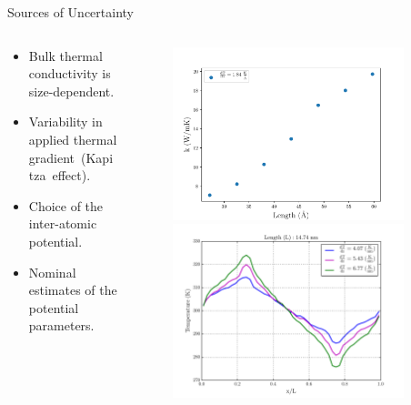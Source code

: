 \documentclass[xcolor={x11names,table},compress,svgnames,mathserif]{beamer}
\renewcommand{\(}{\begin{columns}}
\renewcommand{\)}{\end{columns}}
\newcommand{\<}[1]{\begin{column}{#1}}
\renewcommand{\>}{\end{column}}
\newcommand*\myitem{%
  \item[\color{DeepSkyBlue4}\scalebox{0.6}{\ding{110}}]}
\begin{document}
\begin{frame}{Sources of Uncertainty}

\begin{columns}
\begin{column}{0.52\textwidth}

\begin{itemize}
\myitem Bulk thermal conductivity is size-dependent.
\vspace{2mm}
\myitem Variability in applied thermal gradient~(Kapitza~effect).
\vspace{2mm}
\myitem Choice of the inter-atomic potential.
\vspace{2mm}
\myitem Nominal estimates of the potential parameters.

\end{itemize}
\end{column}

\begin{column}{0.48\textwidth}

\begin{center}
\begin{figure}[htbp]
\vspace{-3mm}
  \includegraphics[width=0.9\textwidth]{./Figures/cond_size}
  \\ \vspace{2mm}
  \includegraphics[width=0.9\textwidth]{./Figures/temp_plot}
\end{figure}
\end{center}


\end{column}
\end{columns}
\end{frame}
\end{document}
